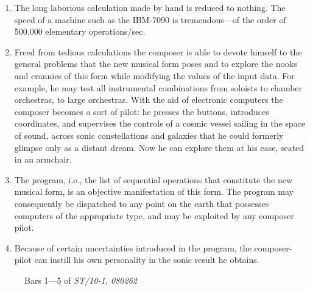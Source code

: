 \documentclass[letterpaper, 11pt]{article}
\begin{document}
\begin{enumerate}
    \item
        The long laborious calculation made by hand is reduced to nothing. The speed of a machine
        such as the IBM-7090 is tremendous---of the order of 500,000 elementary operations/sec.
    \item
        Freed from tedious calculations the composer is able to devote himself to the general
        problems that the new musical form poses and to explore the nooks and crannies of this form
        while modifying the values of the input data. For example, he may test all instrumental
        combinations from soloists to chamber orchestras, to large orchestras. With the aid of
        electronic computers the composer becomes a sort of pilot: he presses the buttons,
        introduces coordinates, and supervises the controls of a cosmic vessel sailing in the space
        of sound, across sonic constellations and galaxies that he could formerly glimpse only as a
        distant dream. Now he can explore them at his ease, seated in an armchair.
    \item
        The program, i.e., the list of sequential operations that constitute the new musical form,
        is an objective manifestation of this form. The program may consequently be dispatched to
        any point on the earth that possesses computers of the appropriate type, and may be
        exploited by any composer pilot.
    \item
        Because of certain uncertainties introduced in the program, the composer-pilot can instill
        his own personality in the sonic result he obtains.
\end{enumerate}

\newpage


\label{fig:fortran}





\begin{figure}
    \centering
    \caption{Bars 1---5 of \textit{ST/10-1, 080262}}
\end{figure}
\end{document}
